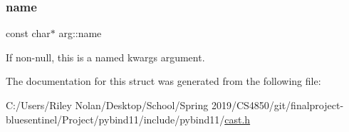 \mbox{\label{structarg_a19d6eebdcc5e2c4679c5f77760adb5dc}} 
\subsubsection{\texorpdfstring{name}{name}}
{\footnotesize\ttfamily const char$\ast$ arg\+::name}



If non-\/null, this is a named kwargs argument. 



The documentation for this struct was generated from the following file\+:\begin{DoxyCompactItemize}
\item 
C\+:/\+Users/\+Riley Nolan/\+Desktop/\+School/\+Spring 2019/\+C\+S4850/git/finalproject-\/bluesentinel/\+Project/pybind11/include/pybind11/\mbox{\hyperlink{cast_8h}{cast.\+h}}\end{DoxyCompactItemize}
